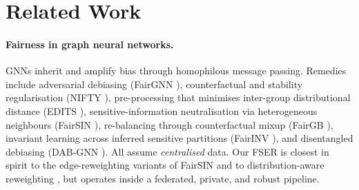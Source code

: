 \documentclass[pdflatex,sn-mathphys-num]{sn-jnl}
\theoremstyle{thmstyleone}%
\theoremstyle{thmstyletwo}%
\theoremstyle{thmstylethree}%
\begin{document}
\section{Related Work}
\label{sec:related}

\paragraph{Fairness in graph neural networks.}
GNNs inherit and amplify bias through homophilous message passing. Remedies
include adversarial debiasing (FairGNN \cite{dai2021say}), counterfactual and
stability regularisation (NIFTY \cite{agarwal2021nifty}), pre-processing that
minimises inter-group distributional distance (EDITS \cite{dong2022edits}),
sensitive-information neutralisation via heterogeneous neighbours (FairSIN
\cite{yang2024fairsin}), re-balancing through counterfactual mixup (FairGB
\cite{li2024fairgb}), invariant learning across inferred sensitive partitions
(FairINV \cite{zhu2024fairinv}), and disentangled debiasing (DAB-GNN
\cite{lee2025dabgnn}). All assume \emph{centralised} data. Our FSER is closest
in spirit to the edge-reweighting variants of FairSIN and to distribution-aware
reweighting \cite{fnrgnn2025}, but operates inside a federated, private, and
robust pipeline.
\end{document}

